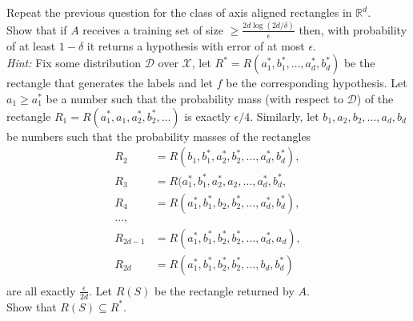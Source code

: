 \documentclass[10pt, a4paper, twoside]{amsart}
\newcommand{\R}{\ensuremath{\mathbb{R}}}
\begin{document}
Repeat the previous question for the class of axis aligned rectangles in $\R^d$. \\
Show that if $A$ receives a training set of size $\geq \frac{2d \log (2d/\delta)}{\epsilon}$ then, with probability of at least $1-\delta$ it returns a hypothesis with error  of at most $\epsilon$.\\
\textit{Hint:} Fix some distribution $\mathcal{D}$ over $\mathcal{X}$, let $R^* = R(a_1^*,b_1^*,\ldots,a_d^*,b_d^*)$ be the rectangle that generates the labels and let $f$ be the corresponding hypothesis. Let $a_1 \geq a_1^*$ be a number such that the probability mass (with respect to $\mathcal{D}$) of the rectangle $R_1 = R(a_1^*,a_1,a_2^*,b_2^*, \ldots)$ is exactly $\epsilon/4$. Similarly, let $b_1,a_2,b_2, \ldots,a_d,b_d$ be numbers such that the probability masses of the rectangles
\begin{align*}
  R_2 & = R(b_1,b_1^*,a_2^*,b_2^*,\ldots ,a_d^*,b_d^*), \\
  R_3 & =  R(a_1^*,b_1^*,a_2^*,a_2, \ldots , a_d^*, b_d^*,\\
  R_4 & =  R(a_1^*,b_1^*,b_2,b_2^*,\ldots , a_d^*,b_d^*), \\
  \ldots, \\
  R_{2d-1} & = R(a_1^*,b_1^*,b_2^*,b_2^*,\ldots , a_d^*,a_d),\\
  R_{2d} & = R(a_1^*,b_1^*,b_2^*,b_2^*,\ldots , b_d,b_d^*)\\
\end{align*}
  are all exactly $\frac{\epsilon}{2d}$. Let $R(S)$ be the rectangle returned by $A$.\\
Show that $R(S)\subseteq R^*$.
\end{document}
